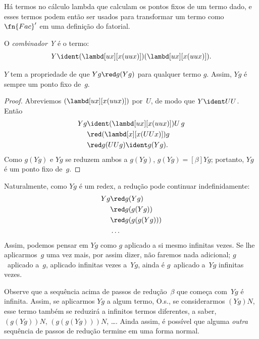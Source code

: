 \documentclass[../../../include/open-logic-section]{subfiles}
\begin{document}
Há termos no cálculo lambda que calculam os pontos fixos de um
termo dado, e esses termos podem então ser usados para transformar um termo como
$\fn{Fac}'$ em uma definição do fatorial. 

\begin{defn}
  O \emph{combinador Y} é o termo:
  \[
  Y \ident (\lambd[ux][x(uux)])(\lambd[ux][x(uux)]).
  \]
\end{defn}

\begin{thm}
  $Y$ tem a propriedade de que $Yg \red g(Yg)$ para qualquer termo $g$. Assim,
  $Yg$ é sempre um ponto fixo de~$g$.
\end{thm}

\begin{proof}
  Abreviemos $(\lambd[ux][x(uux)])$ por~$U$, de modo que $Y \ident UU$. Então
  \begin{align*}
    Y g &\ident (\lambd[ux][x(uux)])U\,g \\
    &\red (\lambd[x][x(UUx)])g\\
    & \red g(UUg) \ident g(Yg).
  \end{align*}
  Como $g(Yg)$ e $Yg$ se reduzem ambos a $g(Yg)$, $g(Yg) \equal[\beta]
  Yg$; portanto, $Yg$ é um ponto fixo de~$g$.
\end{proof}

Naturalmente, como $Yg$ é um redex, a redução pode continuar indefinidamente:
\begin{align*}
  Y g &\red g (Y g) \\
    &\red g (g (Y g)) \\
    &\red g(g (g (Y g)))\\
    &\ldots
\end{align*}
Assim, podemos pensar em $Yg$ como $g$ aplicado a si mesmo infinitas
vezes. Se lhe aplicarmos~$g$ uma vez mais, por assim
dizer, não faremos nada adicional; $g$~aplicado a~$g$, aplicado
infinitas vezes a~$Yg$, ainda é $g$~aplicado a~$Yg$ infinitas
vezes.

Observe que a sequência acima de passos de redução~$\beta$ que começa
com~$Yg$ é infinita. Assim, se aplicarmos $Yg$ a algum termo, O.s.\@,
se considerarmos $(Yg)N$, esse termo também se reduzirá a infinitos
termos diferentes, a saber, $(g(Yg))N$, $(g(g(Yg)))N$, \dots. Ainda assim,
é possível que alguma \emph{outra} sequência de passos de redução
termine em uma forma normal.
\end{document}
